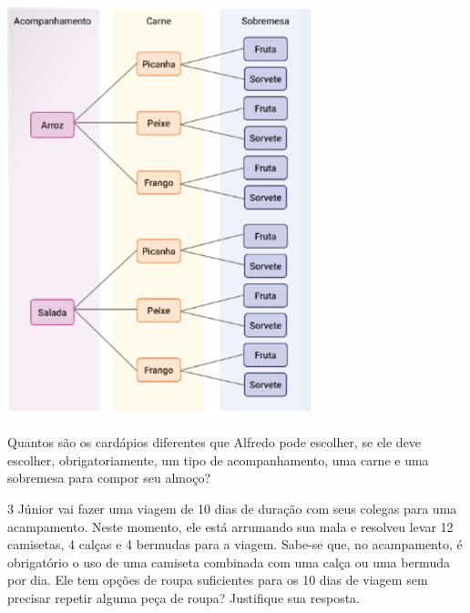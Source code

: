 \includegraphics[width=3.46697in,height=4.68374in]{media/image138.png}

Quantos são os cardápios diferentes que Alfredo pode escolher, se
ele deve escolher, obrigatoriamente, um tipo de acompanhamento, uma
carne e uma sobremesa para compor seu almoço?

\begin{mdframed}[linewidth=2pt,linecolor=salmao,roundcorner=2pt]
\vspace{2cm}
\end{mdframed}

\num{3} Júnior vai fazer uma viagem de 10 dias de duração com seus colegas para
uma acampamento. Neste momento, ele está arrumando sua mala e resolveu
levar 12 camisetas, 4 calças e 4 bermudas para a viagem. Sabe-se que, no
acampamento, é obrigatório o uso de uma camiseta combinada com uma calça
ou uma bermuda por dia. Ele tem opções de roupa suficientes para os 10 dias de viagem sem
precisar repetir alguma peça de roupa? Justifique sua resposta.

\begin{mdframed}[linewidth=2pt,linecolor=salmao,roundcorner=2pt]
\vspace{2cm}
\end{mdframed}

